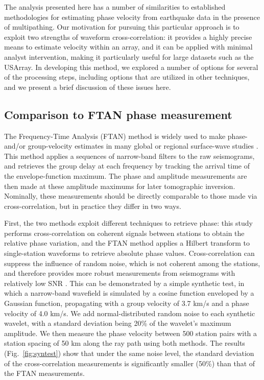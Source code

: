 The analysis presented here has a number of similarities to established methodologies for estimating phase velocity from earthquake data in the presence of multipathing. Our motivation for pursuing this particular approach is to exploit two strengths of waveform cross-correlation: it provides a highly precise means to estimate velocity within an array, and it can be applied with minimal analyst intervention, making it particularly useful for large datasets such as the USArray. In developing this method, we explored a number of options for several of the processing steps, including options that are utilized in other techniques, and we present a brief discussion of these issues here.

\subsection{Comparison to FTAN phase measurement}

The Frequency-Time Analysis (FTAN) method \citep{Levshin:1992ve} is widely used to make phase- and/or group-velocity estimates in many global or regional surface-wave studies \citep[e.g.,][]{Levshin:1992ve,Levshin:2001es,Yang:2011kt,Lin:2011fw}. This method applies a sequences of narrow-band filters to the raw seismograms, and retrieves the group delay at each frequency by tracking the arrival time of the envelope-function maximum. The phase and amplitude measurements are then made at these amplitude maximums for later tomographic inversion. Nominally, these measurements should be directly comparable to those made via cross-correlation, but in practice they differ in two ways.

First, the two methods exploit different techniques to retrieve phase: this study performs cross-correlation on coherent signals between stations to obtain the relative phase variation, and the FTAN method applies a Hilbert transform to single-station waveforms to retrieve absolute phase values. Cross-correlation can suppress the influence of random noise, which is not coherent among the stations, and therefore provides more robust measurements from seismograms with relatively low SNR \citep[e.g.,][]{Landisman:1969gt}. This can be demonstrated by a simple synthetic test, in which a narrow-band wavefield is simulated by a cosine function enveloped by a Gaussian function, propagating with a group velocity of 3.7 km/s and a phase velocity of 4.0 km/s. We add normal-distributed random noise to each synthetic wavelet, with a standard deviation being 20\% of the wavelet's maximum amplitude. We then measure the phase velocity between 500 station pairs with a station spacing of 50 km along the ray path using both methods. The results (Fig.~\ref{fig:syntest}) show that under the same noise level, the standard deviation of the cross-correlation measurements is significantly smaller (50\%) than that of the FTAN measurements.

